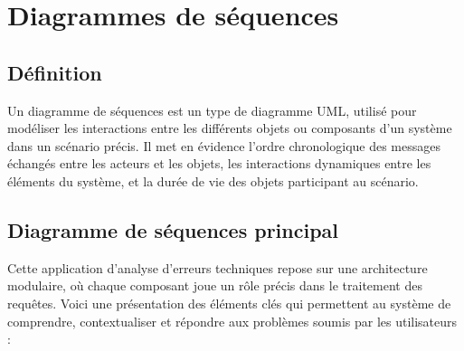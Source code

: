 \documentclass[12pt,a4paper]{report}
\begin{document}
	\section{Diagrammes de séquences}
	
	\subsection{Définition}
	
	Un diagramme de séquences est un type de diagramme UML, utilisé pour modéliser les interactions entre les différents objets ou composants d'un système dans un scénario précis. Il met en évidence l'ordre chronologique des messages échangés entre les acteurs et les objets, les interactions dynamiques entre les éléments du système, et la durée de vie des objets participant au scénario.
	
	\subsection{Diagramme de séquences principal}
	
	Cette application d'analyse d'erreurs techniques repose sur une architecture modulaire, où chaque composant joue un rôle précis dans le traitement des requêtes. Voici une présentation des éléments clés qui permettent au système de comprendre, contextualiser et répondre aux problèmes soumis par les utilisateurs :
	
\end{document}
